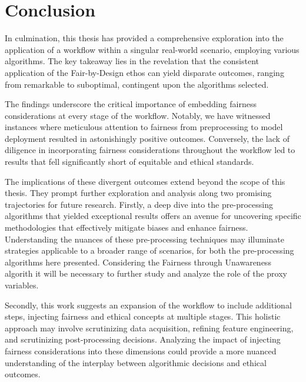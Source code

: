 \chapter{Conclusion}
\label{chap:conclusions}

In culmination, this thesis has provided a comprehensive exploration into the application of a workflow within a singular real-world scenario, employing various algorithms. The key takeaway lies in the revelation that the consistent application of the Fair-by-Design ethos can yield disparate outcomes, ranging from remarkable to suboptimal, contingent upon the algorithms selected.

The findings underscore the critical importance of embedding fairness considerations at every stage of the workflow. Notably, we have witnessed instances where meticulous attention to fairness from preprocessing to model deployment resulted in astonishingly positive outcomes. Conversely, the lack of diligence in incorporating fairness considerations throughout the workflow led to results that fell significantly short of equitable and ethical standards.

The implications of these divergent outcomes extend beyond the scope of this thesis. They prompt further exploration and analysis along two promising trajectories for future research. Firstly, a deep dive into the pre-processing algorithms that yielded exceptional results offers an avenue for uncovering specific methodologies that effectively mitigate biases and enhance fairness. Understanding the nuances of these pre-processing techniques may illuminate strategies applicable to a broader range of scenarios, for both the pre-processing algorithms here presented. Considering the Fairness through Unawareness algorith it will be necessary to further study and analyze the role of the proxy variables.

Secondly, this work suggests an expansion of the workflow to include additional steps, injecting fairness and ethical concepts at multiple stages. This holistic approach may involve scrutinizing data acquisition, refining feature engineering, and scrutinizing post-processing decisions. Analyzing the impact of injecting fairness considerations into these dimensions could provide a more nuanced understanding of the interplay between algorithmic decisions and ethical outcomes.

